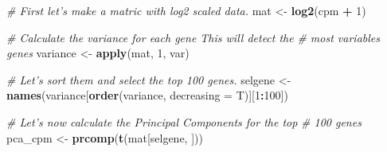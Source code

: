 \documentclass[]{book}
\newenvironment{Shaded}{\begin{snugshade}}{\end{snugshade}}
\newcommand{\CommentTok}[1]{\textcolor[rgb]{0.56,0.35,0.01}{\textit{#1}}}
\newcommand{\DataTypeTok}[1]{\textcolor[rgb]{0.13,0.29,0.53}{#1}}
\newcommand{\DecValTok}[1]{\textcolor[rgb]{0.00,0.00,0.81}{#1}}
\newcommand{\KeywordTok}[1]{\textcolor[rgb]{0.13,0.29,0.53}{\textbf{#1}}}
\newcommand{\NormalTok}[1]{#1}
\newcommand{\OperatorTok}[1]{\textcolor[rgb]{0.81,0.36,0.00}{\textbf{#1}}}
\newcommand{\StringTok}[1]{\textcolor[rgb]{0.31,0.60,0.02}{#1}}
\begin{document}
\begin{Shaded}
\begin{Highlighting}[]
\CommentTok{# First let's make a matric with log2 scaled data.}
\NormalTok{mat <-}\StringTok{ }\KeywordTok{log2}\NormalTok{(cpm }\OperatorTok{+}\StringTok{ }\DecValTok{1}\NormalTok{)}

\CommentTok{# Calculate the variance for each gene This will detect the}
\CommentTok{# most variables genes}
\NormalTok{variance <-}\StringTok{ }\KeywordTok{apply}\NormalTok{(mat, }\DecValTok{1}\NormalTok{, var)}

\CommentTok{# Let's sort them and select the top 100 genes.}
\NormalTok{selgene <-}\StringTok{ }\KeywordTok{names}\NormalTok{(variance[}\KeywordTok{order}\NormalTok{(variance, }\DataTypeTok{decreasing =}\NormalTok{ T)][}\DecValTok{1}\OperatorTok{:}\DecValTok{100}\NormalTok{])}

\CommentTok{# Let's now calculate the Principal Components for the top}
\CommentTok{# 100 genes}
\NormalTok{pca_cpm <-}\StringTok{ }\KeywordTok{prcomp}\NormalTok{(}\KeywordTok{t}\NormalTok{(mat[selgene, ]))}


\end{Highlighting}
\end{Shaded}
\end{document}

